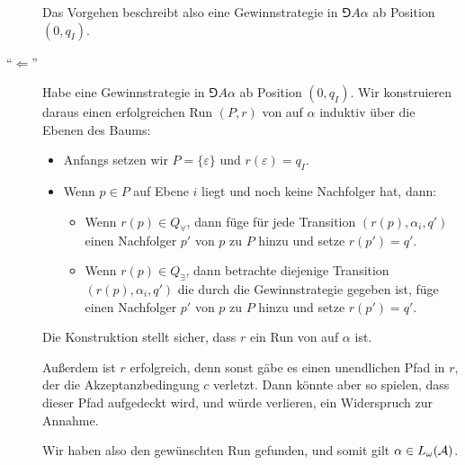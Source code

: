 \documentclass[fontsize=11pt, twoside=false, numbers=autoenddot]{scrbook}
\begin{document}
\begin{description}
    Das Vorgehen beschreibt also eine Gewinnstrategie \PlE
    in $\Game{A}{\alpha}$ ab Position $(0,q_I)$.
    \parI
  \item[{\boldmath "`$\Leftarrow$"'}]
    Habe \PlE eine Gewinnstrategie in $\Game{A}{\alpha}$ ab Position $(0,q_I)$.
    Wir konstruieren daraus einen erfolgreichen Run $(P,r)$ von \Amc auf $\alpha$
    induktiv über die Ebenen des Baums:
    \begin{itemize}
      \item
        Anfangs setzen wir $P = \{\varepsilon\}$ und $r(\varepsilon) = q_I$.
      \item
        Wenn $p \in P$ auf Ebene $i$ liegt und noch keine Nachfolger hat, dann:
        \begin{itemize}
          \item
            Wenn $r(p) \in Q_\forall$,
            dann füge für jede Transition $(r(p),\alpha_i,q')$
            einen Nachfolger $p'$ von $p$ zu $P$ hinzu und setze $r(p') = q'$.
          \item
            Wenn $r(p) \in Q_\exists$,
            dann betrachte diejenige Transition $(r(p),\alpha_i,q')$
            die durch die Gewinnstrategie gegeben ist,
            füge einen Nachfolger $p'$ von $p$ zu $P$ hinzu und setze $r(p') = q'$.
        \end{itemize}
    \end{itemize}
    Die Konstruktion stellt sicher, dass $r$ ein Run von \Amc auf $\alpha$ ist.
    
    Außerdem ist $r$ erfolgreich, denn sonst gäbe es einen unendlichen Pfad in $r$, der
    die Akzeptanzbedingung $c$ verletzt.
    Dann könnte aber \PlA so spielen, dass dieser Pfad aufgedeckt wird,
    und \PlE würde verlieren, ein Widerspruch zur Annahme.
    
    Wir haben also den gewünschten Run gefunden, und somit gilt $\alpha \in L_\omega(\mathcal{A})$.
    \qedhere
\end{description}
\end{document}
